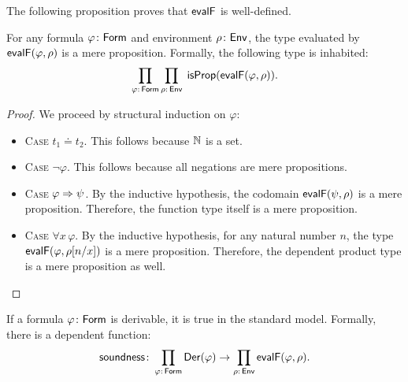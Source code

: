 The following proposition proves that $\mathsf{evalF}$ is well-defined.

\begin{prop}\label{prop:evalf-is-prop}
    For any formula\/ $\varphi\colon\fun{Form}$ and environment\/ $\rho\colon\fun{Env}$, the type evaluated by\/ $\mathsf{evalF}(\varphi, \rho)$ is a mere proposition. Formally, the following type is inhabited:
    \[
        \prod_{\varphi\colon\fun{Form}} \prod_{\rho\colon\fun{Env}}\;
            \fun{isProp}(\fun{evalF}(\varphi,\rho)).
    \]
\end{prop}

\begin{proof}
    We proceed by structural induction on $\varphi$:
    \begin{itemize}
        \item \textsc{Case} $t_1\doteq t_2$. This follows because $\mathbb{N}$ is a set.
        
        \item \textsc{Case} $\neg\varphi$. This follows because all negations are mere propositions.
        
        \item \textsc{Case} $\varphi\mathrel{\Rightarrow}\psi$. By the inductive hypothesis, the codomain $\mathsf{evalF}(\psi,\rho)$ is a mere proposition. Therefore, the function type itself is a mere proposition.
        
        \item \textsc{Case} $\forall x\,\varphi$. By the inductive hypothesis, for any natural number $n$, the type $\mathsf{evalF}(\varphi,\rho[n/x])$ is a mere proposition. Therefore, the dependent product type is a mere proposition as well.
    \end{itemize}
\end{proof}

\begin{thm}[Soundness]
    \label{thm:pa-soundness}
    If a formula\/ $\varphi\colon\fun{Form}$ is derivable, it is true in the standard model. Formally, there is a dependent function:
    \[
        \fun{soundness}\colon
            \prod_{\varphi\colon\fun{Form}}
                \fun{Der}(\varphi)
                \to
                \prod_{\rho\colon\fun{Env}}
                    \fun{evalF}(\varphi,\rho).
    \]
\end{thm}


